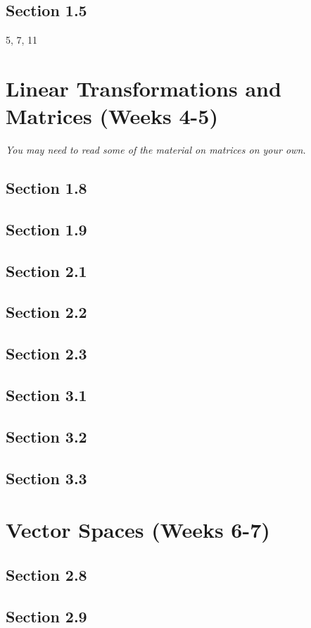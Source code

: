 \documentclass{amsart}
\begin{document}
\subsection*{Section 1.5} 5, 7, 11


\section{Linear Transformations and Matrices (Weeks 4-5)}

\textit{You may need to read some of the material on matrices on your own.}

\subsection*{Section 1.8}
\subsection*{Section 1.9}
\subsection*{Section 2.1}
\subsection*{Section 2.2}
\subsection*{Section 2.3}
\subsection*{Section 3.1}
\subsection*{Section 3.2}
\subsection*{Section 3.3}


\section{Vector Spaces (Weeks 6-7)}

\subsection*{Section 2.8}
\subsection*{Section 2.9}
\end{document}

